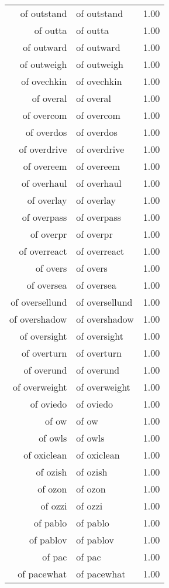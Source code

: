 \begin{table}[ht]
\begin{tabular}{rlr}
  of outstand & of outstand & 1.00 \\ 
  of outta & of outta & 1.00 \\ 
  of outward & of outward & 1.00 \\ 
  of outweigh & of outweigh & 1.00 \\ 
  of ovechkin & of ovechkin & 1.00 \\ 
  of overal & of overal & 1.00 \\ 
  of overcom & of overcom & 1.00 \\ 
  of overdos & of overdos & 1.00 \\ 
  of overdrive & of overdrive & 1.00 \\ 
  of overeem & of overeem & 1.00 \\ 
  of overhaul & of overhaul & 1.00 \\ 
  of overlay & of overlay & 1.00 \\ 
  of overpass & of overpass & 1.00 \\ 
  of overpr & of overpr & 1.00 \\ 
  of overreact & of overreact & 1.00 \\ 
  of overs & of overs & 1.00 \\ 
  of oversea & of oversea & 1.00 \\ 
  of oversellund & of oversellund & 1.00 \\ 
  of overshadow & of overshadow & 1.00 \\ 
  of oversight & of oversight & 1.00 \\ 
  of overturn & of overturn & 1.00 \\ 
  of overund & of overund & 1.00 \\ 
  of overweight & of overweight & 1.00 \\ 
  of oviedo & of oviedo & 1.00 \\ 
  of ow & of ow & 1.00 \\ 
  of owls & of owls & 1.00 \\ 
  of oxiclean & of oxiclean & 1.00 \\ 
  of ozish & of ozish & 1.00 \\ 
  of ozon & of ozon & 1.00 \\ 
  of ozzi & of ozzi & 1.00 \\ 
  of pablo & of pablo & 1.00 \\ 
  of pablov & of pablov & 1.00 \\ 
  of pac & of pac & 1.00 \\ 
  of pacewhat & of pacewhat & 1.00 \\ 

\end{tabular}
\end{table}
